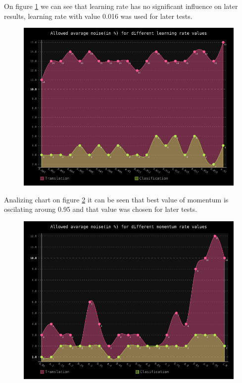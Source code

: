 \documentclass[a4paper]{article}
\begin{document}
On figure \ref{learn} we can see that learning rate has no significant influence on later results, learning rate with value 0.016 was used for later tests.
\begin{figure}[h!]
	\centering
	\includegraphics[scale=0.7,keepaspectratio=true]{Charts/learnChart.png}	
	\caption{}
	\label{learn}
\end{figure} 

Analizing chart on figure \ref{momentum} it can be seen that best value of momentum is oscilating aroung 0.95 and that value was chosen for later tests.
\begin{figure}[h!]
	\centering
	\includegraphics[scale=0.7,keepaspectratio=true]{Charts/momentumChart.png}	
	\caption{}
	\label{momentum}
\end{figure}
\end{document}
